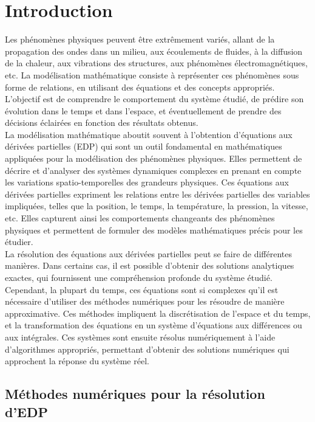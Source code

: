 \chapter{Introduction}
\label{chap:introduction}

Les phénomènes physiques peuvent être extrêmement variés, allant de la propagation des ondes dans un milieu, aux écoulements de fluides, à la diffusion de la chaleur, aux vibrations des structures, aux phénomènes électromagnétiques, etc. La modélisation mathématique consiste à représenter ces phénomènes sous forme de relations, en utilisant des équations et des concepts appropriés. L'objectif est de comprendre le comportement du système étudié, de prédire son évolution dans le temps et dans l'espace, et éventuellement de prendre des décisions éclairées en fonction des résultats obtenus.\\

La modélisation mathématique aboutit souvent à l'obtention d'équations aux dérivées partielles (EDP) qui sont un outil fondamental en mathématiques appliquées pour la modélisation des phénomènes physiques. Elles permettent de décrire et d'analyser des systèmes dynamiques complexes en prenant en compte les variations spatio-temporelles des grandeurs physiques. Ces équations aux dérivées partielles expriment les relations entre les dérivées partielles des variables impliquées, telles que la position, le temps, la température, la pression, la vitesse, etc. Elles capturent ainsi les comportements changeants des phénomènes physiques et permettent de formuler des modèles mathématiques précis pour les étudier.\\

La résolution des équations aux dérivées partielles peut se faire de différentes manières. Dans certains cas, il est possible d'obtenir des solutions analytiques exactes, qui fournissent une compréhension profonde du système étudié. Cependant, la plupart du temps, ces équations sont si complexes qu'il est nécessaire d'utiliser des méthodes numériques pour les résoudre de manière approximative. Ces méthodes impliquent la discrétisation de l'espace et du temps, et la transformation des équations en un système d'équations aux différences ou aux intégrales. Ces systèmes sont ensuite résolus numériquement à l'aide d'algorithmes appropriés, permettant d'obtenir des solutions numériques qui approchent la réponse du système réel.


\section{Méthodes numériques pour la résolution d'EDP}

